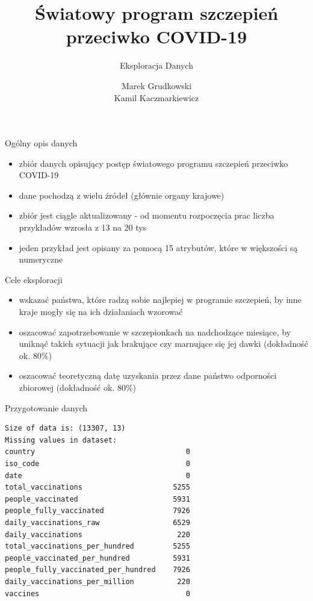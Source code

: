 \documentclass[11pt]{beamer}
\author{Marek Grudkowski \\ Kamil Kaczmarkiewicz}
\title{Światowy program szczepień \\ przeciwko COVID-19}
\subtitle{Eksploracja Danych}
\institute{Politechnika Gdańska}
\date{}
\begin{document}
\begin{frame}
\titlepage
\end{frame}


\begin{frame}{Ogólny opis danych}
\begin{itemize}
\item zbiór danych opisujący postęp światowego programu szczepień przeciwko COVID-19
\item dane pochodzą z wielu źródeł (głównie organy krajowe)
\item zbiór jest ciągle aktualizowany - od momentu rozpoczęcia prac liczba przykładów wzrosła z 13 na 20 tys
\item jeden przykład jest opisany za pomocą 15 atrybutów, które w większości są numeryczne
\end{itemize}
\end{frame}

\begin{frame}{Cele eksploracji}
\begin{itemize}
	\item wskazać państwa, które radzą sobie najlepiej w programie szczepień, by inne kraje mogły się na ich działaniach wzorować
	\item oszacować zapotrzebowanie w szczepionkach na nadchodzące miesiące, by uniknąć takich sytuacji jak brakujące czy marnujące się jej dawki (dokładność ok. 80\%)
	\item oszacować teoretyczną datę uzyskania przez dane państwo odporności zbiorowej (dokładność ok. 80\%)
\end{itemize}
\end{frame}

\begin{frame}[fragile]{Przygotowanie danych}
\begin{lstlisting}
Size of data is: (13307, 13)
Missing values in dataset: 
country                                   0
iso_code                                  0
date                                      0
total_vaccinations                     5255
people_vaccinated                      5931
people_fully_vaccinated                7926
daily_vaccinations_raw                 6529
daily_vaccinations                      220
total_vaccinations_per_hundred         5255
people_vaccinated_per_hundred          5931
people_fully_vaccinated_per_hundred    7926
daily_vaccinations_per_million          220
vaccines                                  0
\end{lstlisting}
\end{frame}
\end{document}
